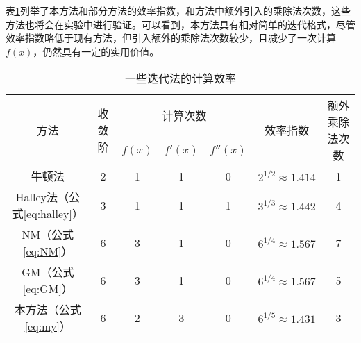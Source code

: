 表\ref{tab:compute-eff}列举了本方法和部分方法的效率指数，和方法中额外引入的乘除法次数，这些方法也将会在实验中进行验证。可以看到，本方法具有相对简单的迭代格式，尽管效率指数略低于现有方法，但引入额外的乘除法次数较少，且减少了一次计算$f(x)$，仍然具有一定的实用价值。

\begin{table}[!htbp]
    \centering
    \caption{一些迭代法的计算效率}
    \label{tab:compute-eff}
    \begin{tabular}{c|c|ccc|cc}
        \toprule
        \multirow{2}{*}{方法} & \multirow{2}{*}{收敛阶} & \multicolumn{3}{c|}{计算次数} & \multirow{2}{*}{效率指数} & \multirow{2}{*}{额外乘除法次数} \\
        \cline{3-5}
        && $f(x)$ & $f'(x)$ & $f''(x)$ & \\
        \midrule
        牛顿法 & 2 & 1 & 1 & 0 & $2^{1/2}\approx 1.414$ & 1 \\
        Halley法（公式\ref{eq:halley}） & 3 & 1 & 1 & 1 & $3^{1/3}\approx 1.442$ & 4 \\
        NM\cite{neta1979sixth}（公式\ref{eq:NM}） & 6 & 3 & 1 & 0 & $6^{1/4}\approx 1.567$ & 7 \\
        GM\cite{grau2006improvement}（公式\ref{eq:GM}） & 6 & 3 & 1 & 0 & $6^{1/4}\approx 1.567$ & 5 \\
        \hline
        本方法（公式\ref{eq:my}） & 6 & 2 & 3 & 0 & $6^{1/5}\approx 1.431$ & 3 \\
        \bottomrule
    \end{tabular}    
\end{table}

